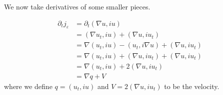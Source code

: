 \documentclass[a4paper]{article}
\begin{document}
We now take derivatives of some smaller pieces.

\begin{align}
  \partial_t j_\varepsilon &= \partial_t (\nabla u, iu) \nonumber \\
  &= ( \nabla u_t, iu) + ( \nabla u, i u_t) \nonumber \\
  &= \nabla (u_t, iu) - (u_t, i \nabla u) + (\nabla u, iu_t) \nonumber \\
  &= \nabla (u_t, iu) + (\nabla u, iu_t) + (\nabla u, iu_t) \nonumber \\
  &= \nabla (u_t, iu) + 2 (\nabla u, iu_t) \nonumber \\
  &= \nabla q + V
  \label{eqn:deriv_current}
\end{align}
where we define $q = (u_t, iu)$ and $V=2(\nabla u, iu_t)$ to be the velocity.
\end{document}
